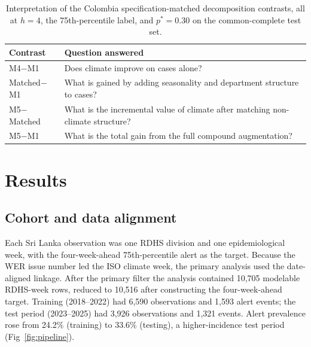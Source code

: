 \documentclass[11pt,a4paper]{article}
\begin{document}
\begin{table}[H]
\centering
\caption{Interpretation of the Colombia specification-matched decomposition contrasts, all at $h=4$, the 75th-percentile label, and $p^*=0.30$ on the common-complete test set.}
\label{tab:contrastq}
\begin{tabular}{ll}
\toprule
Contrast & Question answered \\
\midrule
M4$-$M1 & Does climate improve on cases alone? \\
Matched$-$M1 & What is gained by adding seasonality and department structure to cases? \\
M5$-$Matched & What is the incremental value of climate after matching non-climate structure? \\
M5$-$M1 & What is the total gain from the full compound augmentation? \\
\bottomrule
\end{tabular}
\end{table}

\section{Results}

\subsection{Cohort and data alignment}
Each Sri Lanka observation was one RDHS division and one epidemiological week, with the four-week-ahead 75th-percentile alert as the target. Because the WER issue number led the ISO climate week, the primary analysis used the date-aligned linkage. After the primary filter the analysis contained 10{,}705 modelable RDHS-week rows, reduced to 10{,}516 after constructing the four-week-ahead target. Training (2018--2022) had 6{,}590 observations and 1{,}593 alert events; the test period (2023--2025) had 3{,}926 observations and 1{,}321 events. Alert prevalence rose from 24.2\% (training) to 33.6\% (testing), a higher-incidence test period (Fig~\ref{fig:pipeline}).
\end{document}

